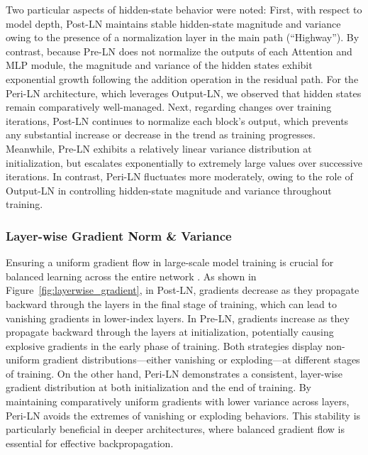 Two particular aspects of hidden-state behavior were noted: First, with respect to model depth, Post-LN maintains stable hidden-state magnitude and variance owing to the presence of a normalization layer in the main path (“Highway”). By contrast, because Pre-LN does not normalize the outputs of each Attention and MLP module, the magnitude and variance of the hidden states exhibit exponential growth following the addition operation in the residual path. For the Peri-LN architecture, which leverages Output-LN, we observed that hidden states remain comparatively well-managed. Next, regarding changes over training iterations, Post-LN continues to normalize each block’s output, which prevents any substantial increase or decrease in the trend as training progresses. Meanwhile, Pre-LN exhibits a relatively linear variance distribution at initialization, but escalates exponentially to extremely large values over successive iterations. In contrast, Peri-LN fluctuates more moderately, owing to the role of Output-LN in controlling hidden-state magnitude and variance throughout training.

\subsubsection{Layer-wise Gradient Norm \& Variance} \label{subsec:grad_norm_var}
Ensuring a uniform gradient flow in large-scale model training is crucial for balanced learning across the entire network \citep{tensorprogram4, tensorprogram6}. As shown in Figure~\ref{fig:layerwise_gradient}, in Post-LN, gradients decrease as they propagate backward through the layers in the final stage of training, which can lead to vanishing gradients in lower-index layers. In Pre-LN, gradients increase as they propagate backward through the layers at initialization, potentially causing explosive gradients in the early phase of training. Both strategies display non-uniform gradient distributions—either vanishing or exploding—at different stages of training. On the other hand, Peri-LN demonstrates a consistent, layer-wise gradient distribution at both initialization and the end of training. By maintaining comparatively uniform gradients with lower variance across layers, Peri-LN avoids the extremes of vanishing or exploding behaviors. This stability is particularly beneficial in deeper architectures, where balanced gradient flow is essential for effective backpropagation. 

